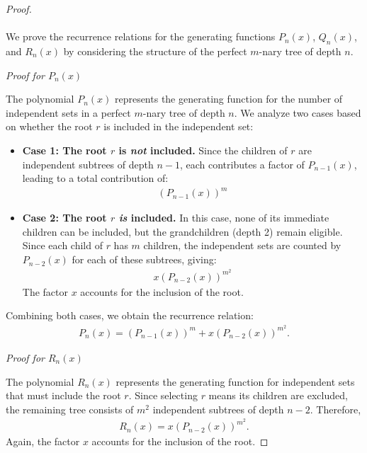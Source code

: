 \documentclass[10pt]{amsart}
\theoremstyle{definition}
\begin{document}
\begin{proof}
	$ $
	\\ \\
	We prove the recurrence relations for the generating functions $P_n(x)$, $Q_n(x)$, and $R_n(x)$ by considering the structure of the perfect $m$-nary tree of depth $n$.
	\vspace{0.5em}

	\textit{Proof for $P_n(x)$}

	The polynomial $P_n(x)$ represents the generating function for the number of independent sets in a perfect $m$-nary tree of depth $n$. We analyze two cases based on whether the root $r$ is included in the independent set:

	\begin{itemize}
		\item \textbf{Case 1: The root $r$ is \emph{not} included.}
		      Since the children of $r$ are independent subtrees of depth $n-1$, each contributes a factor of $P_{n-1}(x)$, leading to a total contribution of:
		      \begin{align*}
			      (P_{n - 1}(x))^m
		      \end{align*}

		\item \textbf{Case 2: The root $r$ \emph{is} included.}
		      In this case, none of its immediate children can be included, but the grandchildren (depth 2) remain eligible. Since each child of $r$ has $m$ children, the independent sets are counted by $P_{n-2}(x)$ for each of these subtrees, giving:
		      \begin{align*}
			      x (P_{n-2}(x))^{m^2}
		      \end{align*}
		      The factor $x$ accounts for the inclusion of the root.
	\end{itemize}

	Combining both cases, we obtain the recurrence relation:
	\begin{align*}
		P_n(x) = (P_{n-1}(x))^m + x (P_{n-2}(x))^{m^2}.
	\end{align*}

	\textit{Proof for $R_n(x)$}

	The polynomial $R_n(x)$ represents the generating function for independent sets that must include the root $r$. Since selecting $r$ means its children are excluded, the remaining tree consists of $m^2$ independent subtrees of depth $n-2$. Therefore,
	\begin{align*}
		R_n(x) = x (P_{n-2}(x))^{m^2}.
	\end{align*}
	Again, the factor $x$ accounts for the inclusion of the root.


\end{proof}
\end{document}
